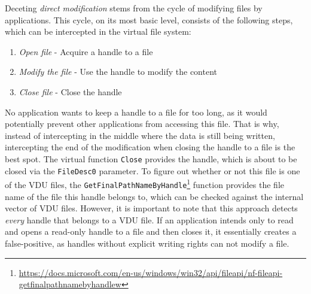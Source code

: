 Deceting \textit{direct modification} stems from the cycle of modifying files by applications. This cycle, on its most basic level, consists of the following steps, which can be intercepted in the virtual file system:
\begin{enumerate}
    \item \textit{Open file} - Acquire a handle to a file
    \item \textit{Modify the file} - Use the handle to modify the content
    \item \textit{Close file} - Close the handle
\end{enumerate}
No application wants to keep a handle to a file for too long, as it would potentially prevent other applications from accessing this file. That is why, instead of intercepting in the middle where the data is still being written, intercepting the end of the modification when closing the handle to a file is the best spot. 
The virtual function \lstinline{Close} provides the handle, which is about to be closed via the \lstinline{FileDesc0} parameter. To figure out whether or not this file is one of the VDU files, the \lstinline{GetFinalPathNameByHandle}\footnote{\url{https://docs.microsoft.com/en-us/windows/win32/api/fileapi/nf-fileapi-getfinalpathnamebyhandlew}} function provides the file name of the file this handle belongs to, which can be checked against the internal vector of VDU files. However, it is important to note that this approach detects \textit{every} handle that belongs to a VDU file. If an application intends only to read and opens a read-only handle to a file and then closes it, it essentially creates a false-positive, as handles without explicit writing rights can not modify a file.

